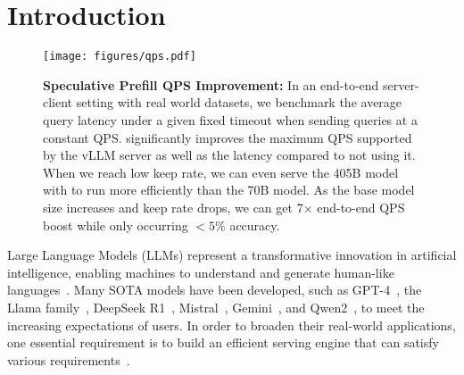 \section{Introduction}

\begin{figure*}[t]
\vskip -0.1in
\begin{center}
\centerline{\texttt{[image: figures/qps.pdf]}}
\vskip -0.2in
\caption{\textbf{Speculative Prefill QPS Improvement:} In an end-to-end server-client setting with real world datasets, we benchmark the average query latency under a given fixed timeout when sending queries at a constant QPS. \ours{} significantly improves the maximum QPS supported by the vLLM server as well as the latency compared to not using it. When we reach low keep rate, we can even serve the 405B model with \ours{} to run more efficiently than the 70B model. As the base model size increases and keep rate drops, we can get 7$\times$ end-to-end QPS boost while only occurring $<5\%$ accuracy. }
\label{fig:qps}
\end{center}
\vskip -0.3in
\end{figure*}

Large Language Models (LLMs) represent a transformative innovation in artificial intelligence, enabling machines to understand and generate human-like languages~\cite{bubeck2023sparksartificialgeneralintelligence, wei2022emergentabilitieslargelanguage, feng2024faragillmsneed}. Many SOTA models have been developed, such as GPT-4~\cite{openai2024gpt4technicalreport}, the Llama family~\cite{grattafiori2024llama3herdmodels}, DeepSeek R1~\cite{deepseekai2025deepseekr1incentivizingreasoningcapability}, Mistral~\cite{jiang2023mistral7b}, Gemini~\cite{geminiteam2024geminifamilyhighlycapable}, and Qwen2~\cite{yang2024qwen2technicalreport}, to meet the increasing expectations of users. In order to broaden their real-world applications, one essential requirement is to build an efficient serving engine that can satisfy various requirements~\cite{miao2023efficientgenerativelargelanguage, kwon2023efficient, zheng2024sglangefficientexecutionstructured, shoeybi2020megatronlmtrainingmultibillionparameter}. 

